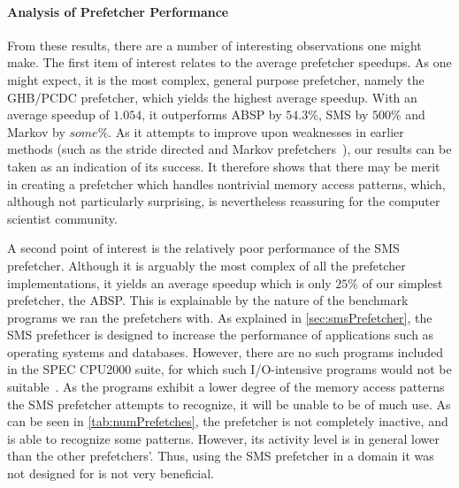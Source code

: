 
\paragraph{Analysis of Prefetcher Performance}
\label{par:varprefperf}



From these results, there are a number of interesting observations one
might make. The first item of interest relates to the average
prefetcher speedups. As one might expect, it is the most complex,
general purpose prefetcher, namely the GHB/PCDC prefetcher, which
yields the highest average speedup. With an average speedup of
$1.054$, it outperforms ABSP by $54.3\%$, SMS by $500\%$ and Markov by
$some\%$. As it attempts to improve upon weaknesses in earlier methods
(such as the stride directed and Markov prefetchers~\cite{Nesbit}),
our results can be taken as an indication of its success. It therefore
shows that there may be merit in creating a prefetcher which handles
nontrivial memory access patterns, which, although not particularly
surprising, is nevertheless reassuring for the computer scientist
community.%

A second point of interest is the relatively poor performance of the
SMS prefetcher. Although it is arguably the most complex of all the
prefetcher implementations, it yields an average speedup which is only
$25\%$ of our simplest prefetcher, the ABSP. This is explainable by
the nature of the benchmark programs we ran the prefetchers with. As
explained in \autoref{sec:smsPrefetcher}, the SMS prefethcer is
designed to increase the performance of applications such as operating
systems and databases. However, there are no such programs included in
the SPEC CPU2000 suite, for which such I/O-intensive programs would
not be suitable~\cite{SPECFAQ}. As the programs exhibit a lower
degree of the memory access patterns the SMS prefetcher attempts to
recognize, it will be unable to be of much use. As can be seen in
\autoref{tab:numPrefetches}, the prefetcher is not completely
inactive, and is able to recognize some patterns. However, its
activity level is in general lower than the other prefetchers'. Thus,
using the SMS prefetcher in a domain it was not designed for is not
very beneficial.


